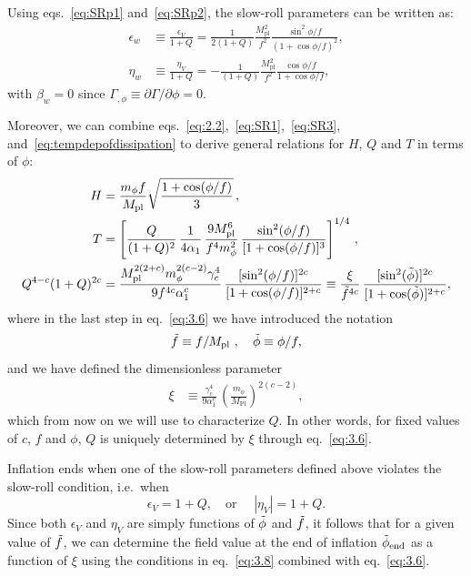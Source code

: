 \documentclass[a4paper,11pt]{article}
\begin{document}
Using eqs.~\eqref{eq:SRp1} and~\eqref{eq:SRp2}, the slow-roll parameters can be written as:
\begin{align}
    \epsilon_{w} &\equiv \frac{\epsilon_V}{1+Q}=\frac{1}{2(1+Q)} \frac{M_{\mathrm{pl}}^{2}}{f^{2}} \frac{\sin ^{2} \phi / f}{(1+\cos \phi / f)^{2}}, \label{eq:SRp11} \\
    \eta_{w} &\equiv \frac{\eta_V}{1+Q}=-\frac{1}{(1+Q)} \frac{M_{\mathrm{pl}}^{2}}{f^{2}} \frac{\cos \phi / f}{1+\cos \phi / f}, \label{eq:SRp22}
\end{align}
with $\beta_{w}=0$ since $\Gamma_{,\phi} \equiv \partial \Gamma/\partial \phi = 0$.

Moreover, we can combine eqs.~\eqref{eq:2.2},~\eqref{eq:SR1},~\eqref{eq:SR3}, and~\eqref{eq:tempdepofdissipation} to derive general relations for $H$, $Q$ and $T$ in terms of $\phi$:
\begin{align}
    H &= \frac{m_\phi f}{M_{\mathrm{pl}}}\sqrt{\frac{1+\cos(\phi/f)}{3}}\,, \\
    T &= \left[ \frac{Q}{(1+Q)^2}\,\frac{1}{4\alpha_1}\, \frac{9 M_{\mathrm{pl}}^6}{f^4 m_\phi^2}\,\frac{\sin^2(\phi/f)}{[1+\cos(\phi/f)]^3}\right]^{1/4}\,, \label{eq:3.5} \\
    Q^{4-c}(1+Q)^{2c} &= \frac{M_{\mathrm{pl}}^{2(2+c)}m_\phi^{2(c-2)}\gamma_c^4}{9 f^{4c} \alpha_1^c}\, \frac{[\sin^2(\phi/f)]^{2c}}{[1+\cos(\phi/f)]^{2+c}}
    \equiv \frac{\xi}{\Tilde{f}^{4c}} \, \frac{[\sin^2(\Tilde{\phi})]^{2c}}{[1+\cos(\Tilde{\phi})]^{2+c}}, \label{eq:3.6}
\end{align}
where in the last step in eq.~\eqref{eq:3.6} we have introduced the notation
\begin{equation}
\Tilde{f}\equiv f/M_{\mathrm{pl}} \,\, , \quad \Tilde{\phi}\equiv\phi/f, \label{eq:3.6.1}
\end{equation}
and we have defined the dimensionless parameter
\begin{align}
    \xi& \equiv \frac{\gamma_c^4}{9 \alpha_1^c}\,\left(\frac{m_{\phi}}{M_{\mathrm{Pl}}}\right)^{2(c-2)}, \label{eq:3.7}
\end{align}
which from now on we will use to characterize $Q$. In other words, for fixed values of $c$, $f$ and $\phi$, $Q$ is uniquely determined by $\xi$ through eq.~\eqref{eq:3.6}.

Inflation ends when one of the slow-roll parameters defined above violates the slow-roll condition, i.e.\ when
\begin{equation}
    \epsilon_V=1+Q, \quad \text{or } \quad |\eta_V|=1+Q. \label{eq:3.8}
\end{equation}
Since both $\epsilon_V$ and $\eta_V$ are simply functions of $\Tilde{\phi}$ and $\Tilde{f}$, it follows that for a given value of $\Tilde{f}$, we can determine the field value at the end of inflation $\Tilde{\phi}_{\mathrm{end}}$ as a function of $\xi$ using the conditions in eq.~\eqref{eq:3.8} combined with eq.~\eqref{eq:3.6}.
\end{document}
